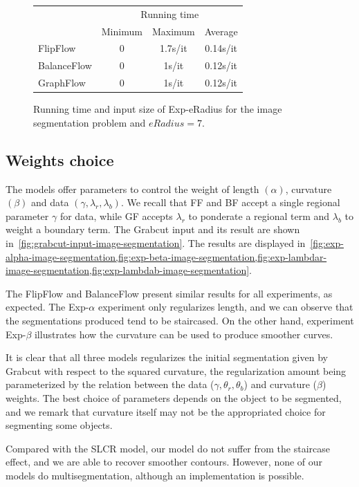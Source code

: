 \begin{figure}
\center
\captionsetup{type=table}
\begin{tabular}{|l|c|c|c|}
\hline
& \multicolumn{3}{|c|}{Running time}\\
& Minimum & Maximum & Average \\
\hline
FlipFlow & 0 & 1.7s/it & 0.14s/it\\
BalanceFlow & 0 & 1s/it & 0.12s/it\\
GraphFlow & 0 & 1s/it & 0.12s/it\\
\hline
\end{tabular}
\caption{Running time and input size of Exp-eRadius for the image segmentation problem and $eRadius=7$.}
\label{tab:rtime-image-segmentation-general} 
\end{figure}

\subsection{Weights choice}
The models offer parameters to control the weight of length $(\alpha)$, curvature $(\beta)$ and data $(\gamma, \lambda _r, \lambda _b)$. We recall that FF and BF accept a single regional parameter $\gamma$ for data, while GF accepts $\lambda _r$ to ponderate a regional term and $\lambda _b$ to weight a boundary term. The Grabcut input and its result are shown in~\cref{fig:grabcut-input-image-segmentation}. The results are displayed in~\cref{fig:exp-alpha-image-segmentation,fig:exp-beta-image-segmentation,fig:exp-lambdar-image-segmentation,fig:exp-lambdab-image-segmentation}. 

The FlipFlow and BalanceFlow present similar results for all experiments, as expected. The Exp-$\alpha$ experiment only regularizes length, and we can observe that the segmentations produced tend to be staircased. On the other hand, experiment Exp-$\beta$ illustrates how the curvature can be used to produce smoother curves. 

It is clear that all three models regularizes the initial segmentation given by Grabcut with respect to the squared curvature, the regularization amount being parameterized by the relation between the data ($\gamma, \theta_r, \theta_b$) and curvature ($\beta$) weights. The best choice of parameters depends on the object to be segmented, and we remark that curvature itself may not be the appropriated choice for segmenting some objects.

Compared with the SLCR model, our model do not suffer from the staircase effect, and we are able to recover smoother contours. However, none of our models do multisegmentation, although an implementation is possible.



